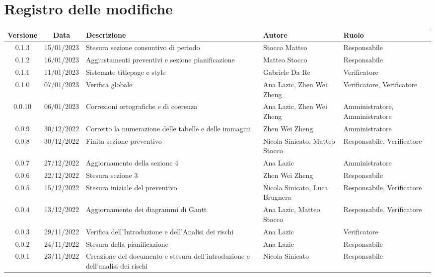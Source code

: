 \section*{Registro delle modifiche}
\begin{center}
	\renewcommand\tabularxcolumn[1]{>{\Centering}m{#1}}
	\setlength\extrarowheight{5pt}
	\begin{tabularx}{\textwidth}{| c | c | X | X | X |} 
		\hline
		\textbf{Versione} & \textbf{Data} & \textbf{Descrizione} & 	\textbf{Autore} & \textbf{Ruolo}\\
		\hline
		0.1.3 & 15/01/2023 & Stesura sezione consuntivo di periodo & Stocco Matteo & Responsabile \\
    \hline
		0.1.2 & 16/01/2023 & Aggiustamenti preventivi e sezione pianificazione & Matteo Stocco & Responsabile \\
	  \hline
		0.1.1 & 11/01/2023 & Sistemate titlepage e style & Gabriele Da Re & Verificatore \\
	  \hline
		0.1.0 & 07/01/2023 & Verifica globale & Ana Lazic, Zhen Wei Zheng & Verificatore, Verificatore \\
	  \hline
		0.0.10 & 06/01/2023 & Correzioni ortografiche e di coerenza & Ana Lazic, Zhen Wei Zheng & Amministratore, Amministratore \\
		\hline
		0.0.9 & 30/12/2022 & Corretto la numerazione delle tabelle e delle immagini & Zhen Wei Zheng & Amministratore\\
		\hline
		0.0.8 & 30/12/2022 & Finita sezione preventivo & Nicola Sinicato, Matteo Stocco & Responsabile, Verificatore\\
		\hline
		0.0.7 & 27/12/2022 & Aggiornamento della sezione 4 & Ana Lazic & 	Amministratore\\
		\hline
		0.0.6 & 22/12/2022 & Stesura sezione 3 & Zhen Wei Zheng & Responsabile\\
		\hline
		0.0.5 & 15/12/2022 & Stesura iniziale del preventivo & Nicola Sinicato, Luca Brugnera & Responsabile, Verificatore\\
		\hline
		0.0.4 & 13/12/2022 & Aggiornamento dei diagrammi di Gantt & Ana Lazic, Matteo Stocco & Responsabile, Verificatore\\
		\hline
		0.0.3 & 29/11/2022 & Verifica dell'Introduzione e dell'Analisi dei rischi & Ana Lazic & Verificatore\\
		\hline
		0.0.2 & 24/11/2022 & Stesura della pianificazione & Ana Lazic & Responsabile\\
		\hline
		0.0.1 & 23/11/2022 & Creazione del documento e stesura dell'introduzione e dell'analisi dei rischi & Nicola Sinicato & Responsabile\\
		\hline
	\end{tabularx}
\end{center}
	
	

